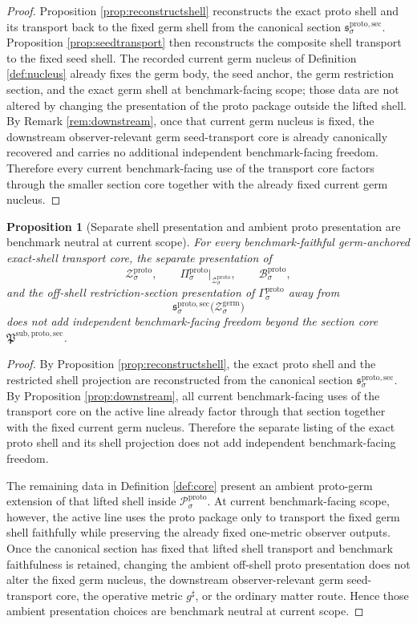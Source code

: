 \documentclass[11pt]{article}
\newcommand{\CompletedMetric}{g^{\sharp}}
\newcommand{\GermShell}[1]{\mathcal Z_{#1}^{\mathrm{germ}}}
\newcommand{\ProtoSectionCore}{\mathfrak P^{\mathrm{sub,proto,sec}}}
\newcommand{\ProtoState}[1]{\mathcal P_{#1}^{\mathrm{proto}}}
\newcommand{\ProtoBody}[1]{\mathcal B_{#1}^{\mathrm{proto}}}
\newcommand{\ProtoProj}[1]{\Pi_{#1}^{\mathrm{proto}}}
\newcommand{\ProtoSection}[1]{\Gamma_{#1}^{\mathrm{proto}}}
\newcommand{\ProtoShell}[1]{\mathcal Z_{#1}^{\mathrm{proto}}}
\newcommand{\ProtoTransportSec}[1]{\mathfrak s_{#1}^{\mathrm{proto,sec}}}
\newtheorem{proposition}{Proposition}
\begin{document}
\begin{proof}
Proposition \ref{prop:reconstructshell} reconstructs the exact proto shell and its transport back to the fixed germ shell from the canonical section \(\ProtoTransportSec{\sigma}\). Proposition \ref{prop:seedtransport} then reconstructs the composite shell transport to the fixed seed shell. The recorded current germ nucleus of Definition \ref{def:nucleus} already fixes the germ body, the seed anchor, the germ restriction section, and the exact germ shell at benchmark-facing scope; those data are not altered by changing the presentation of the proto package outside the lifted shell. By Remark \ref{rem:downstream}, once that current germ nucleus is fixed, the downstream observer-relevant germ seed-transport core is already canonically recovered and carries no additional independent benchmark-facing freedom. Therefore every current benchmark-facing use of the transport core factors through the smaller section core together with the already fixed current germ nucleus.
\end{proof}

\begin{proposition}[Separate shell presentation and ambient proto presentation are benchmark neutral at current scope]
\label{prop:neutral}
For every benchmark-faithful germ-anchored exact-shell transport core, the separate presentation of
\[
\ProtoShell{\sigma},
\qquad
\ProtoProj{\sigma}\big|_{\ProtoShell{\sigma}},
\qquad
\ProtoBody{\sigma},
\]
and the off-shell restriction-section presentation of \(\ProtoSection{\sigma}\) away from
\[
\ProtoTransportSec{\sigma}\bigl(\GermShell{\sigma}\bigr)
\]
does not add independent benchmark-facing freedom beyond the section core \(\ProtoSectionCore\).
\end{proposition}

\begin{proof}
By Proposition \ref{prop:reconstructshell}, the exact proto shell and the restricted shell projection are reconstructed from the canonical section \(\ProtoTransportSec{\sigma}\). By Proposition \ref{prop:downstream}, all current benchmark-facing uses of the transport core on the active line already factor through that section together with the fixed current germ nucleus. Therefore the separate listing of the exact proto shell and its shell projection does not add independent benchmark-facing freedom.

The remaining data in Definition \ref{def:core} present an ambient proto-germ extension of that lifted shell inside \(\ProtoState{\sigma}\). At current benchmark-facing scope, however, the active line uses the proto package only to transport the fixed germ shell faithfully while preserving the already fixed one-metric observer outputs. Once the canonical section has fixed that lifted shell transport and benchmark faithfulness is retained, changing the ambient off-shell proto presentation does not alter the fixed germ nucleus, the downstream observer-relevant germ seed-transport core, the operative metric \(\CompletedMetric\), or the ordinary matter route. Hence those ambient presentation choices are benchmark neutral at current scope.
\end{proof}
\end{document}
